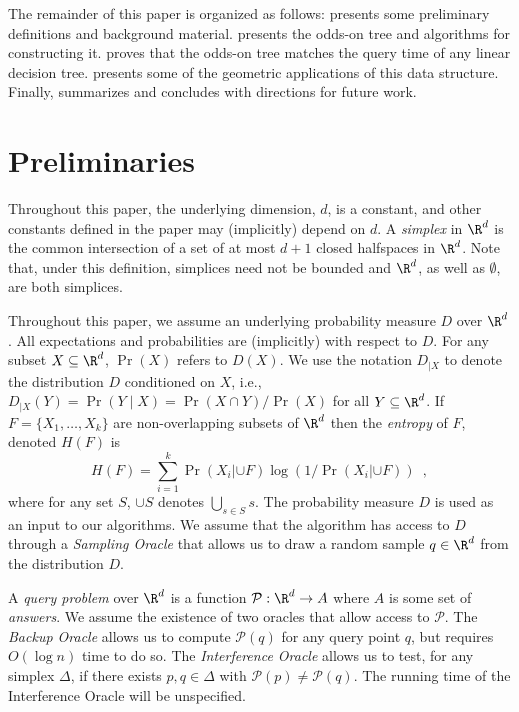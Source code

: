 \documentclass{patmorin}
\begin{document}
The remainder of this paper is organized as follows:
 presents some preliminary definitions and background
material.  presents the odds-on tree and
algorithms for constructing it.   proves that the
odds-on tree matches the query time of any linear decision tree.
 presents some of the geometric applications of this
data structure. Finally,  summarizes and concludes
with directions for future work.

\section{Preliminaries}

Throughout this paper, the underlying dimension, $d$, is a constant, and
other constants defined in the paper may (implicitly) depend on $d$.
A \emph{simplex} in $\R^d$ is the common intersection of a set of at most
$d+1$ closed halfspaces in $\R^d$. Note that, under this definition,
simplices need not be bounded and $\R^d$, as well as $\emptyset$, are
both simplices.


Throughout this paper, we assume an underlying probability measure
$D$ over $\R^d$.  All expectations and probabilities are (implicitly)
with respect to $D$.  For any subset $X\subseteq\R^d$, $\Pr(X)$ refers
to $D(X)$.  We use the notation $D_{|X}$ to denote the distribution $D$
conditioned on $X$, i.e., $D_{|X}(Y)=\Pr(Y\mid X)=\Pr(X\cap Y)/\Pr(X)$
for all $Y\subseteq\R^d$.  If $F=\{X_1,\ldots,X_k\}$ are non-overlapping
subsets of $\R^d$ then the \emph{entropy} of $F$, denoted $H(F)$ is
\[
    H(F) = \sum_{i=1}^k \Pr(X_i|{\cup F})\log(1/\Pr(X_i|{\cup F})) \enspace ,
\]
where for any set $S$, $\cup S$ denotes $\bigcup_{s\in S} s$.
The probability measure $D$ is used as an input to our algorithms.
We assume that the algorithm has access to $D$ through a \emph{Sampling
Oracle} that allows us to draw a random sample $q\in\R^d$ from the
distribution $D$.

A \emph{query problem} over $\R^d$ is a function
$\mathcal{P}:\R^d\rightarrow A$ where $A$ is some set of \emph{answers}.
We assume the existence of two oracles that allow access to $\mathcal{P}$.
The \emph{Backup Oracle} allows us to compute $\mathcal{P}(q)$ for
any query point $q$, but requires $O(\log n)$ time to do so.  The
\emph{Interference Oracle} allows us to test, for any simplex $\Delta$,
if there exists $p,q\in\Delta$ with $\mathcal{P}(p)\neq\mathcal{P}(q)$.
The running time of the Interference Oracle will be unspecified.
\end{document}
